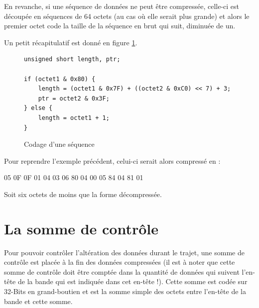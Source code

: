 En revanche, si une séquence de données ne peut être compressée, celle-ci
est découpée en séquences de 64 octets (au cas où elle serait plus grande)
et alors le premier octet code la taille de la séquence en brut qui suit,
diminuée de un.

Un petit récapitulatif est donné en figure \ref{fig:code_comp}.
\begin{figure}[!ht]
\centering
\begin{verbatim}
unsigned short length, ptr;

if (octet1 & 0x80) {
    length = (octet1 & 0x7F) + ((octet2 & 0xC0) << 7) + 3;
    ptr = octet2 & 0x3F;
} else {
    length = octet1 + 1;
}
\end{verbatim}
\caption{Codage d'une séquence}
\label{fig:code_comp}
\end{figure}

Pour reprendre l'exemple précédent, celui-ci serait alors compressé en :
\begin{exemple}
05 0F 0F 01 04 03 06 80 04 00 05 84 04 81 01
\end{exemple}

Soit six octets de moins que la forme décompressée.

\section{La somme de contrôle}
Pour pouvoir contrôler l'altération des données durant le trajet, une somme de
contrôle est placée à la fin des données compressées (il est à noter que cette
somme de contrôle doit être comptée dans la quantité de données qui suivent
l'en-tête de la bande qui est indiquée dans cet en-tête !). Cette somme est
codée sur 32-Bits en grand-boutien et est la somme simple des octets entre
l'en-tête de la bande et cette somme.
